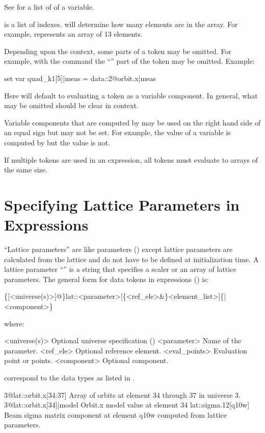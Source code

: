 See  for a list of  of a variable.

 is a list of indexes.  will determine
how many elements are in the array. For example,  
represents an array of 13 elements. 

Depending upon the context, some parts of a token may be omitted. For example,
with the  command the ``'' part of the token may be omitted.
Example:
\begin{example}
  set var quad_k1[5]|meas = data::2@orbit.x|meas
\end{example}
Here \tao will default to evaluating a token as a variable component. In general, what may
be omitted should be clear in context.

Variable components that are computed by \tao may be used on the right hand side of an equal
sign but may not be set. For example, the  value of a variable is computed by \tao
but the  value is not.

If multiple tokens are used in an expression, all tokens must evaluate to arrays of the
same size.

\section{Specifying Lattice Parameters in Expressions}
\label{s:lat.token}

``Lattice parameters'' are like  parameters () except lattice
parameters are calculated from the lattice and do not have to be defined at initialization
time.  A lattice parameter ``'' is a string that specifies a scaler or an array of lattice
parameters. The general form for data tokens in expressions () is:
\begin{example}
  \{[<universe(s)>]@\}lat::<parameter>[\{<ref_ele>&\}<element_list>]\{|<component>\}
\end{example}
where:
\begin{example}
  <universe(s)>       Optional universe specification ()
  <parameter>         Name of the parameter.
  <ref_ele>           Optional reference element.
  <eval_points>       Evaluation point or points.
  <component>         Optional component. 
\end{example}
correspond to the data types as listed in . 
\begin{example}
  3@lat::orbit.x[34:37]          Array of orbits at element 34 through 37 in universe 3.
  3@lat::orbit.x[34]|model       Orbit.x model value at element 34
  lat::sigma.12[q10w]            Beam sigma matrix component at element q10w computed 
                                  from lattice parameters.
\end{example}

